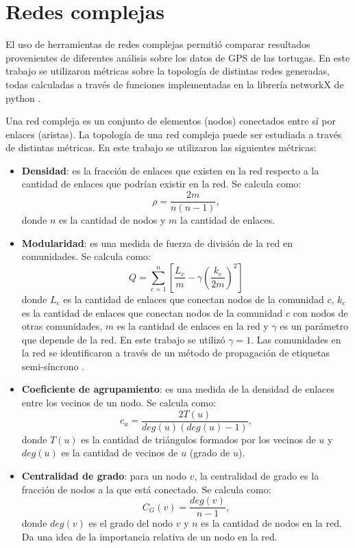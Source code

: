 \section{Redes complejas}
El uso de herramientas de redes complejas permitió comparar resultados provenientes de diferentes análisis sobre los datos de GPS de las tortugas. En este trabajo se utilizaron métricas sobre la topología de distintas redes generadas, todas calculadas a través de funciones implementadas en la librería networkX de python \cite{networkx}.
 
Una red compleja es un conjunto de elementos (nodos) conectados entre sí por enlaces (aristas). La topología de una red compleja puede ser estudiada a través de distintas métricas. En este trabajo se utilizaron las siguientes métricas:
\begin{itemize}
    \item \textbf{Densidad}: es la fracción de enlaces que existen en la red respecto a la cantidad de enlaces que podrían existir en la red. Se calcula como:
    \begin{equation}
        \rho = \frac{2m}{n(n-1)},
    \end{equation}
    donde $n$ es la cantidad de nodos y $m$ la cantidad de enlaces.
    \item  \textbf{Modularidad}: es una medida de fuerza de división de la red en comunidades. Se calcula como:
    \begin{equation}
        Q = \sum_{c=1}^{n}
        \left[ \frac{L_c}{m} - \gamma\left( \frac{k_c}{2m} \right) ^2 \right]
    \end{equation}
    donde $L_c$ es la cantidad de enlaces que conectan nodos de la comunidad $c$, $k_c$ es la cantidad de enlaces que conectan nodos de la comunidad $c$ con nodos de otras comunidades, $m$ es la cantidad de enlaces en la red y $\gamma$ es un parámetro que depende de la red. En este trabajo se utilizó $\gamma = 1$. Las comunidades en la red se identificaron a través de un método de propagación de etiquetas semi-síncrono \cite{cordasco2010community}.
    \item \textbf{Coeficiente de agrupamiento}: es una medida de la densidad de enlaces entre los vecinos de un nodo. Se calcula como:
    \begin{equation}
        c_u = \frac{2 T(u)}{deg(u)(deg(u)-1)},
    \end{equation}
    donde $T(u)$ es la cantidad de triángulos formados por los vecinos de $u$ y $deg(u)$ es la cantidad de vecinos de $u$ (grado de $u$).
 
   \item \textbf{Centralidad de grado}: para un nodo $v$, la centralidad de grado es la fracción de nodos a la que está conectado. Se calcula como:
    \begin{equation}
        C_G(v) = \frac{deg(v)}{n-1},
    \end{equation}
    donde $deg(v)$ es el grado del nodo $v$ y $n$ es la cantidad de nodos en la red. Da una idea de la importancia relativa de un nodo en la red.
 
\end{itemize}
 
 
 
 
 
 
 
 
 
 

